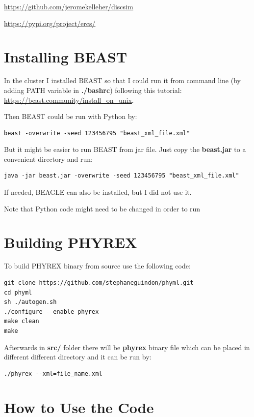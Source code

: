 \url{https://github.com/jeromekelleher/discsim}

\url{https://pypi.org/project/ercs/}

\section*{Installing BEAST}

In the cluster I installed BEAST so that I could run it from command line (by adding PATH variable in \textbf{./bashrc}) following this tutorial: \url{https://beast.community/install_on_unix}.

Then BEAST could be run with Python by:

\begin{verbatim}
beast -overwrite -seed 123456795 "beast_xml_file.xml"
\end{verbatim}

But it might be easier to run BEAST from jar file. Just copy the \textbf{beast.jar} to a convenient directory and run:

\begin{verbatim}
java -jar beast.jar -overwrite -seed 123456795 "beast_xml_file.xml"
\end{verbatim}

If needed, BEAGLE can also be installed, but I did not use it.

Note that Python code might need to be changed in order to run 


\section*{Building PHYREX}
To build PHYREX binary from source use the following code:
\begin{verbatim}
git clone https://github.com/stephaneguindon/phyml.git
cd phyml
sh ./autogen.sh
./configure --enable-phyrex
make clean
make
\end{verbatim}

Afterwards in \textbf{src/} folder there will be \textbf{phyrex} binary file which can be placed in different different directory and it can be run by:

\begin{verbatim}
./phyrex --xml=file_name.xml
\end{verbatim}

\clearpage

\section*{How to Use the Code}



